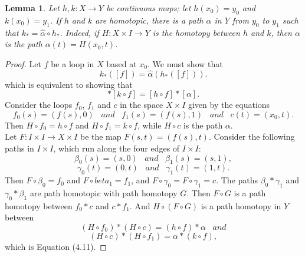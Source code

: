 \documentclass[psamsfonts]{amsart}
\newtheorem{lem}[thm]{Lemma}
\theoremstyle{definition}
\theoremstyle{remark}
\numberwithin{equation}{section}
\begin{document}
	\begin{lem}
		Let $h,k:X \to Y$ be continuous maps; let $h(x_0)=y_0$ and $k(x_0)=y_1$. If $h$ and $k$ are homotopic, there is a path $\alpha$ in $Y$ from $y_0$ to $y_1$ such that $k_*=\hat{\alpha} \circ h_*$. Indeed, if $H: X \times I \to Y$ is the homotopy between $h$ and $k$, then $\alpha$ is the path $\alpha(t)=H(x_0,t)$.
	\end{lem}
	\begin{proof}
		Let $f$ be a loop in $X$ based at $x_0$. We must show that 
		\begin{equation}
			k_*([f]) = \hat{\alpha}(h_*([f])).
		\end{equation}
		which is equivalent to showing that
		\begin{equation}
			[\alpha]*[k \circ f] = [h \circ f]*[\alpha].
		\end{equation}
		Consider the loops $f_0$, $f_1$ and $c$ in the space $X \times I$ given by the equations
		\begin{equation}
			f_0(s) = (f(s),0) \;\;\; and \;\;\; f_1(s) = (f(s),1) \;\;\; and \;\;\; c(t) = (x_0,t).
		\end{equation}
		Then $H \circ f_0 = h \circ f$ and $H \circ f_1 = k \circ f$, while $H \circ c$ is the path $\alpha$.\\
		Let $F: I \times I \to X \times I$ be the map $F(s,t)=(f(s),t)$. Consider the following paths in $I\times I$, which run along the four edges of $I \times I$:
		\begin{equation}
			\beta_0(s)=(s,0) \;\;\; and \;\;\; \beta_1(s)=(s,1),
		\end{equation}
		\begin{equation}
			\gamma_0(t) = (0,t) \;\;\; and \;\;\; \gamma_1(t) = (1,t).
		\end{equation}
		Then $F \circ \beta_0 = f_0$ and $F \circ beta_1 = f_1$, and $F \circ \gamma_0 = F \circ \gamma_1 = c$.
		The paths $\beta_0 * \gamma_1$ and $\gamma_0*\beta_1$ are path homotopic with path homotopy $G$. Then $F \circ G$ is a path homotopy between $f_0*c$ and $c*f_1$. And $H \circ (F \circ G)$ is a path homotopy in $Y$ between
		\begin{equation}
			(H \circ f_0)*(H \circ c) = (h \circ f)*\alpha \;\;\; and
		\end{equation}
		\begin{equation}
			(H \circ c)*(H \circ f_1) = \alpha*(k \circ f),
		\end{equation}
		which is Equation (4.11).
	\end{proof}
	
\end{document}
